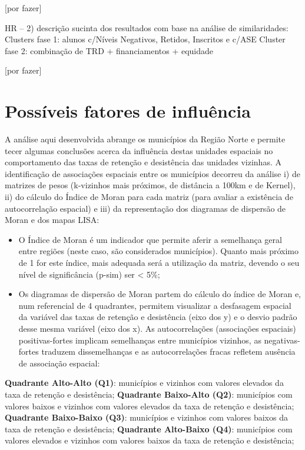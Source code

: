 \documentclass[
]{book}
\providecommand{\tightlist}{%
  \setlength{\itemsep}{0pt}\setlength{\parskip}{0pt}}
\begin{document}
{[}por fazer{]}

HR -- 2) descrição sucinta dos resultados com base na análise de similaridades:
Clusters fase 1: alunos c/Níveis Negativos, Retidos, Inscritos e c/ASE
Cluster fase 2: combinação de TRD + financiamentos + equidade

{[}por fazer{]}

\hypertarget{possuxedveis-fatores-de-influuxeancia}{%
\section{Possíveis fatores de influência}\label{possuxedveis-fatores-de-influuxeancia}}

A análise aqui desenvolvida abrange os municípios da Região Norte e permite tecer algumas conclusões acerca da influência destas unidades espaciais no comportamento das taxas de retenção e desistência das unidades vizinhas. A identificação de associações espaciais entre os municípios decorreu da análise i) de matrizes de pesos (k-vizinhos mais próximos, de distância a 100km e de Kernel), ii) do cálculo do Índice de Moran para cada matriz (para avaliar a existência de autocorrelação espacial) e iii) da representação dos diagramas de dispersão de Moran e dos mapas LISA:

\begin{itemize}
\tightlist
\item
  O Índice de Moran é um indicador que permite aferir a semelhança geral entre regiões (neste caso, são considerados municípios). Quanto mais próximo de 1 for este índice, mais adequada será a utilização da matriz, devendo o seu nível de significância (p-sim) ser \textless{} 5\%;
\item
  Os diagramas de dispersão de Moran partem do cálculo do índice de Moran e, num referencial de 4 quadrantes, permitem visualizar a desfasagem espacial da variável das taxas de retenção e desistência (eixo dos y) e o desvio padrão desse mesma variável (eixo dos x). As autocorrelações (associações espaciais) positivas-fortes implicam semelhanças entre municípios vizinhos, as negativas-fortes traduzem dissemelhanças e as autocorrelações fracas refletem ausência de associação espacial:
\end{itemize}

\textbf{Quadrante Alto-Alto (Q1)}: municípios e vizinhos com valores elevados da taxa de retenção e desistência;
\textbf{Quadrante Baixo-Alto (Q2)}: municípios com valores baixos e vizinhos com valores elevados da taxa de retenção e desistência;
\textbf{Quadrante Baixo-Baixo (Q3)}: municípios e vizinhos com valores baixos da taxa de retenção e desistência;
\textbf{Quadrante Alto-Baixo (Q4)}: municípios com valores elevados e vizinhos com valores baixos da taxa de retenção e desistência;
\end{document}
